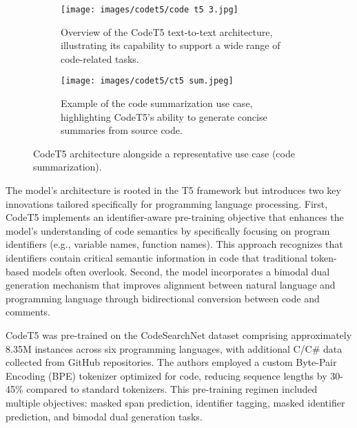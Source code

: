 \documentclass[a4paper, 11pt, twoside, openright]{report}
\begin{document}
\begin{figure}[ht]
    \centering
    \begin{subfigure}{0.45\textwidth}
        \centering
        \texttt{[image: images/codet5/code t5 3.jpg]}
        \caption{Overview of the CodeT5 text-to-text architecture, illustrating its capability to support a wide range of code-related tasks.}
        \label{fig:codeT5-text2text}
    \end{subfigure}
    \hfill
    \begin{subfigure}{0.45\textwidth}
        \centering
        \texttt{[image: images/codet5/ct5 sum.jpeg]}
        \caption{Example of the code summarization use case, highlighting CodeT5's ability to generate concise summaries from source code.}
        \label{codet5-sum}
    \end{subfigure}
    \caption{CodeT5 architecture alongside a representative use case (code summarization).}
    \label{fig:figure1}
\end{figure}

The model's architecture is rooted in the T5 framework but introduces two key innovations tailored specifically for programming language processing. First, CodeT5 implements an identifier-aware pre-training objective that enhances the model's understanding of code semantics by specifically focusing on program identifiers (e.g., variable names, function names). This approach recognizes that identifiers contain critical semantic information in code that traditional token-based models often overlook. Second, the model incorporates a bimodal dual generation mechanism that improves alignment between natural language and programming language through bidirectional conversion between code and comments.

CodeT5 was pre-trained on the CodeSearchNet dataset comprising approximately 8.35M instances across six programming languages, with additional C/C\# data collected from GitHub repositories. The authors employed a custom Byte-Pair Encoding (BPE) tokenizer optimized for code, reducing sequence lengths by 30-45\% compared to standard tokenizers. This pre-training regimen included multiple objectives: masked span prediction, identifier tagging, masked identifier prediction, and bimodal dual generation tasks.
\end{document}
